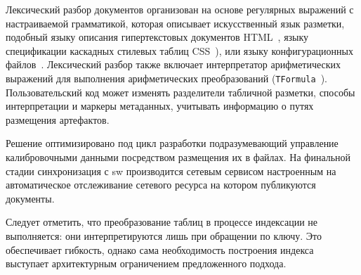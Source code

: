 Лексический разбор документов организован на основе регулярных
выражений с настраиваемой грамматикой, которая описывает
искусственный язык разметки, подобный
языку описания гипертекстовых документов HTML~\cite{berners1989information},
языку спецификации каскадных стилевых таблиц CSS~\cite{lie1996cascading}),
или языку конфигурационных файлов~\cite{yaml-rfc9512}.
Лексический разбор также включает интерпретатор
арифметических выражений для выполнения арифметических
преобразований (\texttt{TFormula}~\cite{ROOT-framework}).
Пользовательский код
может изменять разделители табличной разметки, способы
интерпретации и маркеры метаданных, учитывать информацию
о путях размещения артефактов.

Решение оптимизировано под цикл разработки подразумевающий
управление калибровочными данными посредством размещения их
в файлах. На финальной стадии синхронизация с \acrshort{sw}
производится сетевым сервисом настроенным на автоматическое
отслеживание сетевого ресурса на котором публикуются документы.

Следует отметить, что преобразование таблиц в процессе индексации
не выполняется: они интерпретируются лишь при обращении по ключу.
Это обеспечивает гибкость, однако сама необходимость построения
индекса выступает архитектурным ограничением предложенного подхода.